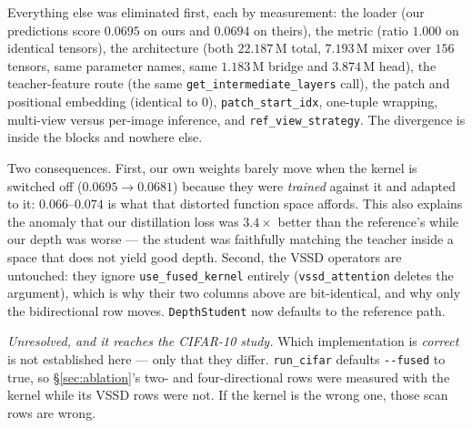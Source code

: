 \documentclass[11pt,a4paper]{article}
\begin{document}
Everything else was eliminated first, each by measurement: the loader (our predictions score
$0.0695$ on ours and $0.0694$ on theirs), the metric (ratio $1.000$ on identical tensors), the
architecture (both $22.187$\,M total, $7.193$\,M mixer over $156$ tensors, same parameter names,
same $1.183$\,M bridge and $3.874$\,M head), the teacher-feature route (the same
\texttt{get\_intermediate\_layers} call), the patch and positional embedding (identical to $0$),
\texttt{patch\_start\_idx}, one-tuple wrapping, multi-view versus per-image inference, and
\texttt{ref\_view\_strategy}. The divergence is inside the blocks and nowhere else.

Two consequences. First, our own weights barely move when the kernel is switched off
($0.0695\to0.0681$) because they were \emph{trained} against it and adapted to it: $0.066$--$0.074$
is what that distorted function space affords. This also explains the anomaly that our distillation
loss was $3.4\times$ better than the reference's while our depth was worse --- the student was
faithfully matching the teacher inside a space that does not yield good depth. Second, the VSSD
operators are untouched: they ignore \texttt{use\_fused\_kernel} entirely (\texttt{vssd\_attention}
deletes the argument), which is why their two columns above are bit-identical, and why only the
bidirectional row moves. \texttt{DepthStudent} now defaults to the reference path.

\emph{Unresolved, and it reaches the CIFAR-10 study.} Which implementation is \emph{correct} is not
established here --- only that they differ. \texttt{run\_cifar} defaults \texttt{-{}-fused} to true,
so \S\ref{sec:ablation}'s two- and four-directional rows were measured with the kernel while its
VSSD rows were not. If the kernel is the wrong one, those scan rows are wrong.
\end{document}

